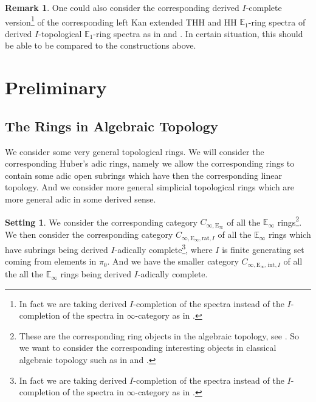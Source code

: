 \documentclass[11pt]{book}
\theoremstyle{definition}
\newtheorem{remark}[theorem]{Remark}
\numberwithin{equation}{section}
\newtheorem{setting}[theorem]{Setting}
\begin{document}
 
\begin{remark}
One could also consider the corresponding derived $I$-complete version\footnote{In fact we are taking derived $I$-completion of the spectra instead of the $I$-completion of the spectra in $\infty$-category as in  \cite[Chapter 7.3]{12Lu2}.} of the corresponding left Kan extended THH and HH $\mathbb{E}_1$-ring spectra of derived $I$-topological $\mathbb{E}_1$-ring spectra as in \cite{12NS} and \cite{KKM}. In certain situation, this should be able to be compared to the constructions above.
\end{remark}






\newpage


\section{Preliminary}

\subsection{The Rings in Algebraic Topology}

We consider some very general topological rings. We will consider the corresponding Huber's adic rings, namely we allow the corresponding rings to contain some adic open subrings which have then the corresponding linear topology. And we consider more general simplicial topological rings which are more general adic in some derived sense.

\begin{setting}
We consider the corresponding category $C_{\infty,\mathrm{E}_\infty}$ of all the $\mathbb{E}_\infty$ rings\footnote{These are the corresponding ring objects in the algebraic topology, see \cite[Chapter 7]{12Lu1}. So we want to consider the corresponding interesting objects in classical algebraic topology such as in \cite{12MP} and \cite{12N}.}. We then consider the corresponding category $C_{\infty,\mathrm{E}_\infty,\mathrm{rat},I}$ of all the $\mathbb{E}_\infty$ rings which have subrings being derived $I$-adically complete\footnote{In fact we are taking derived $I$-completion of the spectra instead of the $I$-completion of the spectra in $\infty$-category as in  \cite[Chapter 7.3]{12Lu2}.}, where $I$ is finite generating set coming from elements in $\pi_0$. And we have the smaller category $C_{\infty,\mathrm{E}_\infty,\mathrm{int},I}$ of all the all the $\mathbb{E}_\infty$ rings being derived $I$-adically complete.	
\end{setting}
\end{document}
